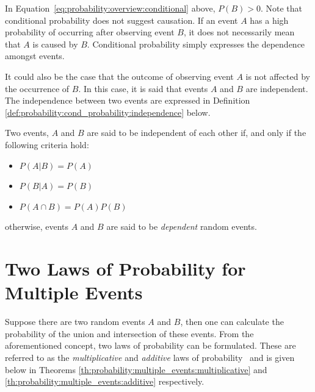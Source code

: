 In Equation~\eqref{eq:probability:overview:conditional} above, $P(B) > 0$. Note that conditional probability does not suggest causation. If an event $A$ has a high probability of occurring after observing event $B$, it does not necessarily mean that $A$ is caused by $B$. Conditional probability simply expresses the dependence amongst events.

It could also be the case that the outcome of observing event $A$ is not affected by the occurrence of $B$. In this case, it is said that events $A$ and $B$ are independent. The independence between two events are expressed in Definition \ref{def:probability:cond_probability:independence} below.
\\
\begin{definition}
      \label{def:probability:cond_probability:independence}
      Two events, $A$ and $B$ are said to be independent of each other if, and only if the following criteria hold:

      \begin{itemize}
            \item $P(A \vert B) = P(A)$
            \item $P(B \vert A) = P(B)$
            \item $P(A \cap B) = P(A)P(B)$
      \end{itemize}

      otherwise, events $A$ and $B$ are said to be \textit{dependent} random events.
\end{definition}

\section{Two Laws of Probability for Multiple Events}\label{sec:probability:multiple_events}

Suppose there are two random events $A$ and $B$, then one can calculate the probability of the union and intersection of these events. From the aforementioned concept, two laws of probability can be formulated. These are referred to as the \textit{multiplicative} and \textit{additive} laws of probability~\cite{ref:wackerly:2014} and is given below in Theorems \ref{th:probability:multiple_events:multiplicative} and \ref{th:probability:multiple_events:additive} respectively.\\

